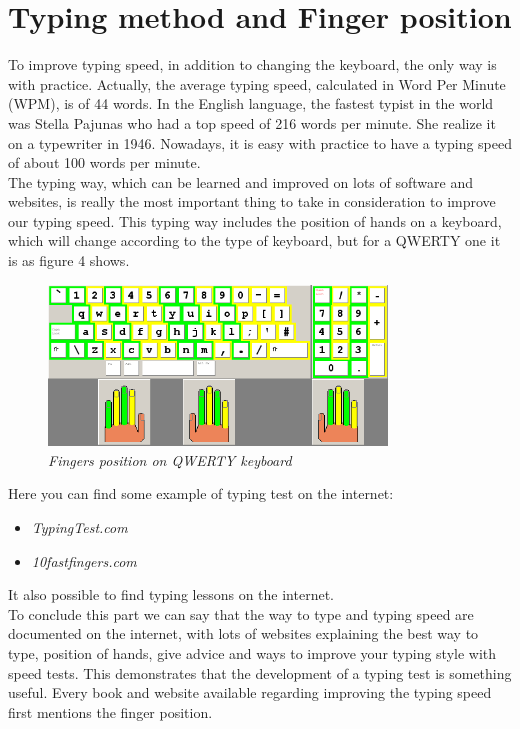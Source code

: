 \section{Typing method and Finger position}
To improve typing speed, in addition to changing the keyboard, the only way is with practice. Actually, the average typing speed, calculated in Word Per Minute (WPM), is of 44 words.\cite{ref7} In the English language, the fastest typist in the world was Stella Pajunas who had a top speed of 216 words per minute. She realize it on a typewriter in 1946. Nowadays, it is easy with practice to have a typing speed of about 100 words per minute.\\ 
The typing way, which can be learned and improved on lots of software and websites, is really the most important thing to take in consideration to improve our typing speed. This typing way includes the position of hands on a keyboard, which will change according to the type of keyboard, but for a QWERTY one it is as figure 4 shows.
\begin{figure}[H]
\begin{center}
\includegraphics[width=9cm]{images/FingerHandPosUSA.png} 
\end{center}
\caption{\it Fingers position on QWERTY keyboard}
\label{Poulpy est multicolore}
\end{figure}
Here you can find some example of typing test on the internet:
\begin{itemize}
\item\it TypingTest.com\cite{ref8}
\item\it 10fastfingers.com\cite{ref9}
\end{itemize}
It also possible to find typing lessons on the internet.\\
To conclude this part we can say that the way to type and typing speed are documented on the internet, with lots of websites explaining the best way to type, position of hands, give advice and ways to improve your typing style with speed tests. This demonstrates that the development of a typing test is something useful.
Every book and website available regarding improving the typing speed first mentions the finger position.\\
